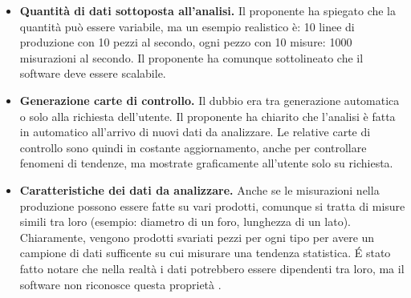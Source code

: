 \documentclass[a4paper,12pt]{article}
\begin{document}
\begin{itemize}

\item \textbf{Quantità di dati sottoposta all'analisi.} Il proponente ha spiegato che la quantità può essere variabile, ma un esempio realistico è: 10 linee di produzione con 10 pezzi al secondo, ogni pezzo con 10 misure: 1000 misurazioni al secondo. Il proponente ha comunque sottolineato che il software deve essere scalabile.

\item \textbf{Generazione carte di controllo.} Il dubbio era tra generazione automatica o solo alla richiesta dell'utente. Il proponente ha chiarito che l'analisi è fatta in automatico all'arrivo di nuovi dati da analizzare. Le relative carte di controllo sono quindi in costante aggiornamento, anche per controllare fenomeni di tendenze, ma mostrate graficamente all'utente solo su richiesta.

\item \textbf{Caratteristiche dei dati da analizzare.} Anche se le misurazioni nella produzione possono essere fatte su vari prodotti, comunque si tratta di misure simili tra loro (esempio: diametro di un foro, lunghezza di un lato). Chiaramente, vengono prodotti svariati pezzi per ogni tipo per avere un campione di dati sufficente su cui misurare una tendenza statistica. É stato fatto notare che nella realtà i dati potrebbero essere dipendenti tra loro, ma il software non riconosce questa proprietà .

\end{itemize}
\end{document}
